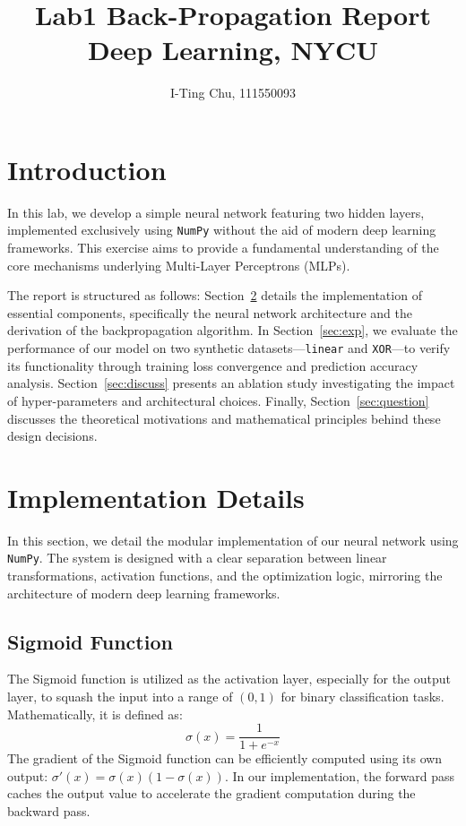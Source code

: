 \documentclass[10pt,twocolumn,letterpaper]{article}
\begin{document}
\title{\LARGE Lab1 Back-Propagation Report \\[0.5em] \large Deep Learning, NYCU}
\author{I-Ting Chu, 111550093}
\maketitle

\section{Introduction}
\label{sec:intro}

In this lab, we develop a simple neural network featuring two hidden layers, implemented exclusively using \texttt{NumPy} without the aid of modern deep learning frameworks. This exercise aims to provide a fundamental understanding of the core mechanisms underlying Multi-Layer Perceptrons (MLPs). 

The report is structured as follows: 
Section~\ref{sec:implement} details the implementation of essential components, specifically the neural network architecture and the derivation of the backpropagation algorithm. 
In Section~\ref{sec:exp}, we evaluate the performance of our model on two synthetic datasets—\texttt{linear} and \texttt{XOR}—to verify its functionality through training loss convergence and prediction accuracy analysis. 
Section~\ref{sec:discuss} presents an ablation study investigating the impact of hyper-parameters and architectural choices. 
Finally, Section~\ref{sec:question} discusses the theoretical motivations and mathematical principles behind these design decisions.

\section{Implementation Details} \label{sec:implement}

In this section, we detail the modular implementation of our neural network using \texttt{NumPy}. The system is designed with a clear separation between linear transformations, activation functions, and the optimization logic, mirroring the architecture of modern deep learning frameworks.

\subsection{Sigmoid Function}
The Sigmoid function is utilized as the activation layer, especially for the output layer, to squash the input into a range of $(0, 1)$ for binary classification tasks. 
Mathematically, it is defined as:
\[
    \sigma(x) = \frac{1}{1 + e^{-x}}
\]
The gradient of the Sigmoid function can be efficiently computed using its own output: $\sigma'(x) = \sigma(x)(1 - \sigma(x))$. In our implementation, the forward pass caches the output value to accelerate the gradient computation during the backward pass.
\end{document}
